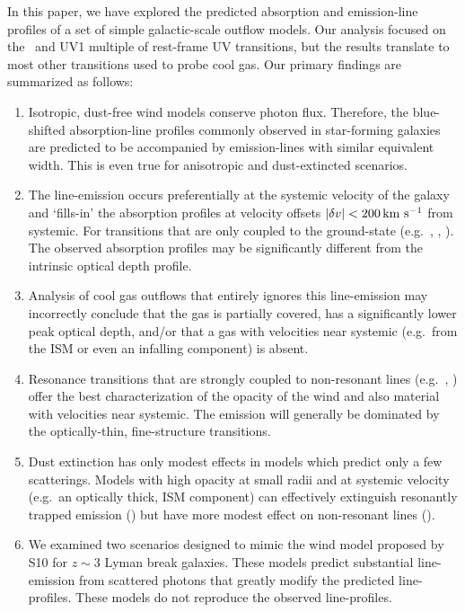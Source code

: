 \documentclass[12pt,preprint]{aastex}
\begin{document}
In this paper, we have explored the predicted absorption and
emission-line profiles of a set of simple galactic-scale outflow
models.  Our analysis focused on the \mgiid\ and  UV1
multiple of rest-frame UV transitions, but the results translate to
most other transitions used to probe cool gas.  Our primary
findings are summarized as follows:

\begin{enumerate}

\item Isotropic, dust-free wind models conserve photon flux.
  Therefore, the blue-shifted absorption-line profiles commonly
  observed in star-forming galaxies are predicted to be accompanied by
  emission-lines with similar equivalent width.  This is even true for
  anisotropic and dust-extincted scenarios.

\item The line-emission occurs preferentially at the systemic velocity
  of the galaxy and `fills-in' the absorption profiles at velocity
  offsets $|\delta v| < 200 \, {\rm km~s^{-1}}$ from systemic.  For transitions that
  are only coupled to the ground-state (e.g.\ , \lya,
  ). The observed absorption profiles may be significantly
  different from the intrinsic optical depth profile.

\item Analysis of cool gas outflows that entirely ignores this
line-emission may incorrectly conclude that the gas is partially
covered, has a significantly lower peak optical depth, and/or that a
gas with velocities near systemic (e.g.\ from the ISM or even
an infalling component) is absent.   


\item Resonance transitions that are strongly coupled to
non-resonant lines (e.g.\ , ) offer the best
characterization of the opacity of the wind and also material 
with velocities near systemic.  The emission will generally be dominated by the
optically-thin, fine-structure transitions.

\item  Dust extinction has only modest effects 
  in models which predict only a few scatterings.  Models
  with high opacity at small radii and at systemic velocity (e.g.\ an
  optically thick, ISM component)  can effectively extinguish
  resonantly trapped emission () but have more modest
  effect on non-resonant lines (\feiis).

\item We examined two scenarios designed to mimic the wind model
  proposed by S10 for $z \sim 3$ Lyman break galaxies.  These models
  predict substantial line-emission from scattered photons that
  greatly modify the predicted line-profiles.  
  These models do not reproduce the observed line-profiles.



\end{enumerate}
\end{document}
